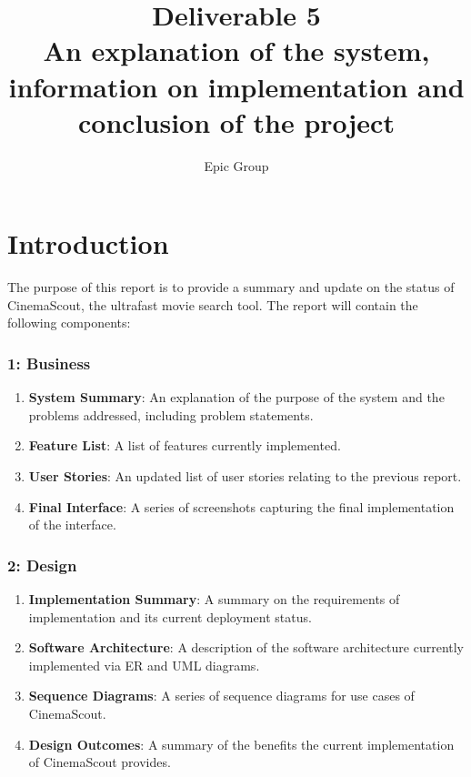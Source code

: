 \documentclass{article}
\begin{document}
\title{%
 Deliverable 5\\
 \large An explanation of the system, information on implementation and\\
 \large conclusion of the project
}
\author{Epic Group}
\date{}
\maketitle

\section*{Introduction}
The purpose of this report is to provide a summary and update on the status of
CinemaScout, the ultrafast movie search tool. The report will contain the following
components:
\subsubsection*{1: Business}
\begin{enumerate}
\item \textbf{System Summary}: An explanation of the purpose of the system
and the problems addressed, including problem statements.
\item \textbf{Feature List}: A list of features currently implemented.
\item \textbf{User Stories}: An updated list of user stories relating to the
previous report.
\item \textbf{Final Interface}: A series of screenshots capturing the final
implementation of the interface.
\end{enumerate}
\subsubsection*{2: Design}
\begin{enumerate}
\item \textbf{Implementation Summary}: A summary on the requirements of
implementation and its current deployment status.
\item \textbf{Software Architecture}: A description of the software
architecture currently implemented via ER and UML diagrams.
\item \textbf{Sequence Diagrams}: A series of sequence diagrams for
use cases of CinemaScout.
\item \textbf{Design Outcomes}: A summary of the benefits the current 
implementation of CinemaScout provides.
\end{enumerate}
\end{document}
